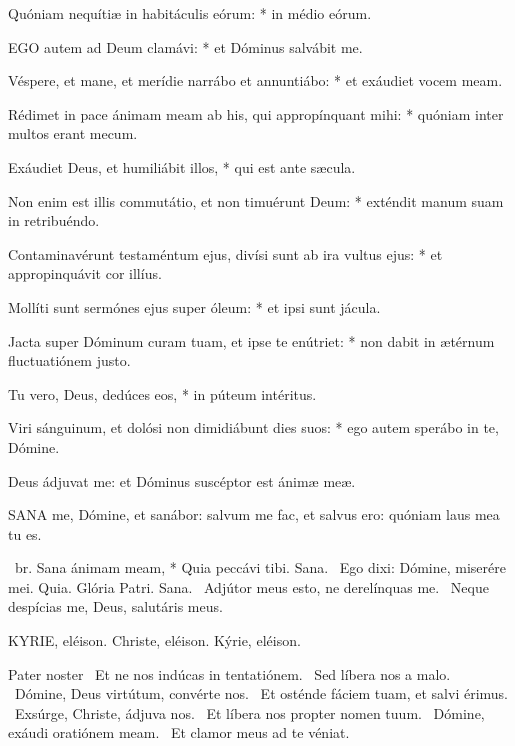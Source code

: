Quóniam nequítiæ in habitáculis eórum: * in médio eórum.


\lettrine[lines=2]{E}{GO} autem ad Deum clamávi: * et Dóminus salvábit me.

Véspere, et mane, et merídie narrábo et annuntiábo: * et exáudiet vocem meam.

Rédimet in pace ánimam meam ab his, qui appropínquant mihi: * quóniam inter multos erant mecum.

Exáudiet Deus, et humiliábit illos, * qui est ante sæcula.

Non enim est illis commutátio, et non timuérunt Deum: * exténdit manum suam in retribuéndo.

Contaminavérunt testaméntum ejus, divísi sunt ab ira vultus ejus: * et appropinquávit cor illíus.

Mollíti sunt sermónes ejus super óleum: * et ipsi sunt jácula.

Jacta super Dóminum curam tuam, et ipse te enútriet: * non dabit in ætérnum fluctuatiónem justo.

Tu vero, Deus, dedúces eos, * in púteum intéritus.

Viri sánguinum, et dolósi non dimidiábunt dies suos: * ego autem sperábo in te, Dómine.

 Deus ádjuvat me: et Dóminus suscéptor est ánimæ meæ.



\lettrine[lines=2]{S}{ANA} me, Dómine, et sanábor: salvum me fac, et salvus ero: quóniam laus mea tu es.

\R\ br. Sana ánimam meam, * Quia peccávi tibi. Sana. \V\ Ego dixi: Dómine, miserére mei. Quia. Glória Patri. Sana. \V\ Adjútor meus esto, ne derelínquas me. \R\ Neque despícias me, Deus, salutáris meus.



KYRIE, eléison. Christe, eléison. Kýrie, eléison.

Pater noster  \V\ Et ne nos indúcas in tentatiónem. \R\ Sed líbera nos a malo. \V\ Dómine, Deus virtútum, convérte nos. \R\ Et osténde fáciem tuam, et salvi érimus. \V\ Exsúrge, Christe, ádjuva nos. \R\ Et líbera nos propter nomen tuum. \V\ Dómine, exáudi oratiónem meam. \R\ Et clamor meus ad te véniat.

